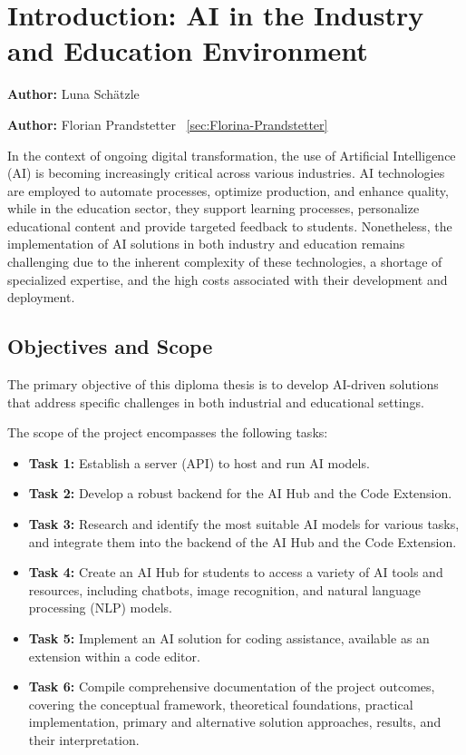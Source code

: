 \chapter{Introduction: AI in the Industry and Education Environment}
\label{chap:introduction}
\textbf{Author:} Luna Schätzle

\textbf{Author:} Florian Prandstetter ~\ref{sec:Florina-Prandstetter}

In the context of ongoing digital transformation, the use of Artificial Intelligence (AI) is becoming increasingly critical across various industries. 
AI technologies are employed to automate processes, optimize production, and enhance quality, while in the education sector, they support learning processes, 
personalize educational content and provide targeted feedback to students. Nonetheless, 
the implementation of AI solutions in both industry and education remains challenging due to the inherent complexity of these technologies, a shortage of specialized expertise, 
and the high costs associated with their development and deployment.

\section{Objectives and Scope}

The primary objective of this diploma thesis is to develop AI-driven solutions that address specific challenges in both industrial and educational settings.

The scope of the project encompasses the following tasks:
\begin{itemize}
    \item \textbf{Task 1:} Establish a server (API) to host and run AI models.
    \item \textbf{Task 2:} Develop a robust backend for the AI Hub and the Code Extension.
    \item \textbf{Task 3:} Research and identify the most suitable AI models for various tasks, and integrate them into the backend of the AI Hub and the Code Extension.
    \item \textbf{Task 4:} Create an AI Hub for students to access a variety of AI tools and resources, including chatbots, image recognition, and natural language processing (NLP) models.
    \item \textbf{Task 5:} Implement an AI solution for coding assistance, available as an extension within a code editor.
    \item \textbf{Task 6:} Compile comprehensive documentation of the project outcomes, covering the conceptual framework, theoretical foundations, practical implementation, primary and alternative solution approaches, results, and their interpretation.
\end{itemize}

